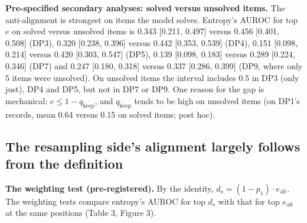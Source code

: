 \documentclass[
  10pt,
  a4paper,
]{article}
\begin{document}
\textbf{Pre-specified secondary analyses: solved versus unsolved items.} The anti-alignment is strongest on items the model solves. Entropy's AUROC for top \(e\) on solved versus unsolved items is
0.343 {[}0.211, 0.497{]} versus 0.456 {[}0.401, 0.508{]} (DP3), 0.320 {[}0.238, 0.396{]} versus 0.442 {[}0.353, 0.539{]} (DP4), 0.151 {[}0.098, 0.214{]} versus 0.420 {[}0.303, 0.547{]} (DP5), 0.139
{[}0.098, 0.183{]} versus 0.289 {[}0.224, 0.346{]} (DP7) and 0.247 {[}0.180, 0.318{]} versus 0.337 {[}0.286, 0.399{]} (DP9, where only 5 items were unsolved). On unsolved items the interval includes
0.5 in DP3 (only just), DP4 and DP5, but not in DP7 or DP9. One reason for the gap is mechanical: \(e \le 1-q_{\mathrm{keep}}\), and \(q_{\mathrm{keep}}\) tends to be high on unsolved items (on DP1's
records, mean 0.64 versus 0.15 on solved items; post hoc).

\hypertarget{the-resampling-sides-alignment-largely-follows-from-the-definition}{%
\subsection{The resampling side's alignment largely follows from the definition}\label{the-resampling-sides-alignment-largely-follows-from-the-definition}}

\textbf{The weighting test (pre-registered).} By the identity, \(d_{s} = (1-p_1) \cdot e_{\mathrm{alt}}\). The weighting tests compare entropy's AUROC for top \(d_{s}\) with that for top
\(e_{\mathrm{alt}}\) at the same positions (Table 3, Figure 3).
\end{document}
